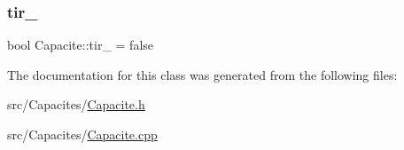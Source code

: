 \mbox{\label{class_capacite_ae5318fb64d0def1069a9730c497d4bb6}} 
\subsubsection{\texorpdfstring{tir\+\_\+}{tir\_}}
{\footnotesize\ttfamily bool Capacite\+::tir\+\_\+ = false\hspace{0.3cm}{\ttfamily [protected]}}



The documentation for this class was generated from the following files\+:\begin{DoxyCompactItemize}
\item 
src/\+Capacites/\mbox{\hyperlink{_capacite_8h}{Capacite.\+h}}\item 
src/\+Capacites/\mbox{\hyperlink{_capacite_8cpp}{Capacite.\+cpp}}\end{DoxyCompactItemize}
